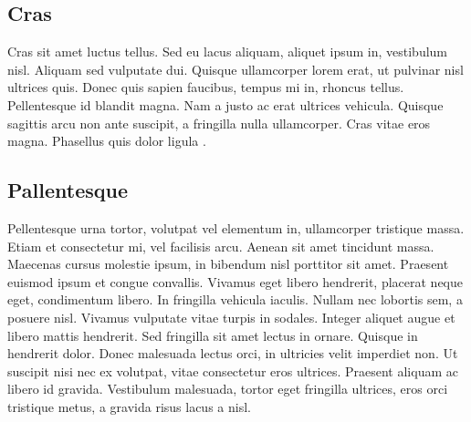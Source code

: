 \subsection{Cras}
Cras sit amet luctus tellus. Sed eu lacus aliquam, aliquet ipsum in, vestibulum nisl. Aliquam sed vulputate dui. Quisque ullamcorper lorem erat, ut pulvinar nisl ultrices quis. Donec quis sapien faucibus, tempus mi in, rhoncus tellus. Pellentesque id blandit magna. Nam a justo ac erat ultrices vehicula. Quisque sagittis arcu non ante suscipit, a fringilla nulla ullamcorper. Cras vitae eros magna. Phasellus quis dolor ligula \cite{Bizzarri2013}.

\subsection{Pallentesque}
Pellentesque urna tortor, volutpat vel elementum in, ullamcorper tristique massa. Etiam et consectetur mi, vel facilisis arcu. Aenean sit amet tincidunt massa. Maecenas cursus molestie ipsum, in bibendum nisl porttitor sit amet. Praesent euismod ipsum et congue convallis. Vivamus eget libero hendrerit, placerat neque eget, condimentum libero. In fringilla vehicula iaculis. Nullam nec lobortis sem, a posuere nisl. Vivamus vulputate vitae turpis in sodales. Integer aliquet augue et libero mattis hendrerit. Sed fringilla sit amet lectus in ornare. Quisque in hendrerit dolor. Donec malesuada lectus orci, in ultricies velit imperdiet non. Ut suscipit nisi nec ex volutpat, vitae consectetur eros ultrices. Praesent aliquam ac libero id gravida. Vestibulum malesuada, tortor eget fringilla ultrices, eros orci tristique metus, a gravida risus lacus a nisl. 
